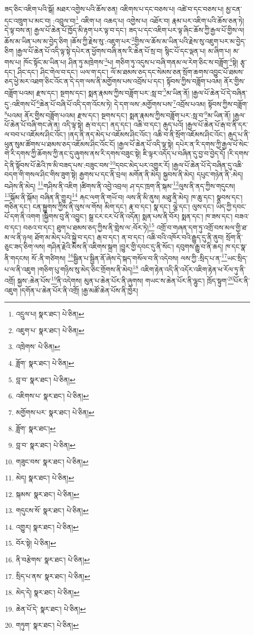 ཟད་ཅིང་འཇིག་པའི་སྒོ། མཐར་འགྱེས་པའི་ཆོས་ཅན། འཇིགས་པ་དང་བཅས་པ། འཚེ་བ་དང་བཅས་པ། མྱ་ངན་དང་འཁྲུག་པ་མང་བ། :འབྲུལ་བ།\footnote{འདྲུལ་པ།  སྣར་ཐང་།  པེ་ཅིན། } འཇིག་པ། འཆད་པ། འགྱེས་པ། འཐོར་བ། རྣམ་པར་འཇིག་པའི་ཆོས་ཅན་ཏེ། དེ་ལྟ་བས་ན། རྒྱལ་པོ་ཆེན་པོ་ཁྱོད་མི་རྟག་པར་ལྟ་བ་དང་། ཟད་པ་དང་འཇིག་པར་ལྟ་ཞིང་ཆོས་ཀྱི་རྒྱལ་པོ་གྱིས་ལ། ཆོས་མ་ཡིན་པས་མ་བྱེད་ཅིག །ཆོས་ཀྱི་རྗེས་སུ་:འཇུག་པར་\footnote{འཇུག་པ་  སྣར་ཐང་།  པེ་ཅིན། }གྱིས་ལ་ཆོས་མ་ཡིན་པའི་རྗེས་སུ་འཇུག་པར་མ་བྱེད་ཅིག །རྒྱལ་པོ་ཆེན་པོ་འདི་ལྟ་སྟེ་དཔེར་ན་ཕྱོགས་བཞི་ནས་རི་ཆེན་པོ་སྲ་བ། སྙིང་པོ་དང་ལྡན་པ། མ་ཞིག་པ། མ་གས་པ། ཁོང་སྟོང་མ་ཡིན་པ། ཤིན་ཏུ་མཁྲེགས་\footnote{འཁྲེགས་  པེ་ཅིན། }པ། གཅིག་ཏུ་འདུས་པ་བཞི་གནམ་ལ་རེག་ཅིང་ས་བཟློག་\footnote{ཟློག་  སྣར་ཐང་།  པེ་ཅིན། }སྟེ། རྩྭ་དང་། ཤིང་དང་། ཤིང་གེལ་བ་དང་། ཡལ་ག་དང་། ལོ་མ་ཐམས་ཅད་དང་སེམས་ཅན་སྲོག་ཆགས་འབྱུང་པོ་ཐམས་ཅད་ཕྱེ་མར་འཐག་ཅིང་འོང་ན་དེ་དག་ལས་ནི་མགྱོགས་པས་འབྲོས་པ་དང་། སྟོབས་ཀྱིས་བཟློག་པའམ། ནོར་གྱིས་བཟློག་པའམ། རྫས་དང་། སྔགས་དང་། སྨན་རྣམས་ཀྱིས་བཟློག་པར་:སླ་བ་\footnote{བླ་བ་  སྣར་ཐང་།  པེ་ཅིན། }མ་ཡིན་ནོ། །རྒྱལ་པོ་ཆེན་པོ་དེ་བཞིན་དུ་:འཇིགས་པོ་\footnote{འཇིགས་པ་  སྣར་ཐང་།  པེ་ཅིན། }ཆེན་པོ་བཞི་པོ་འདི་དག་འོངས་ཏེ། དེ་དག་ལས་:མགྱོགས་པས་\footnote{མགྱོགས་པར་  སྣར་ཐང་།  པེ་ཅིན། }འབྲོས་པའམ། སྟོབས་ཀྱིས་བཟློག་\footnote{ཟློག་  སྣར་ཐང་། }པའམ། ནོར་གྱིས་བཟློག་པའམ། རྫས་དང་། སྔགས་དང་། སྨན་རྣམས་ཀྱིས་བཟློག་པར་:སླ་བ་\footnote{བླ་བ་  སྣར་ཐང་།  པེ་ཅིན། }མ་ཡིན་ནོ། །རྒྱལ་པོ་ཆེན་པོ་བཞི་གང་ཞེ་ན། འདི་ལྟ་སྟེ། རྒ་བ་དང་། ནད་དང་། འཆི་བ་དང་། རྒུད་པའོ། །རྒྱལ་པོ་ཆེན་པོ་རྒ་བ་ནི་དར་ལ་བབ་པ་འཇོམས་ཤིང་འོང་། །ནད་ནི་ནད་མེད་པ་འཇོམས་ཤིང་འོང་། འཆི་བ་ནི་སྲོག་འཇོམས་ཤིང་འོང་། རྒུད་པ་ནི་ཕུན་སུམ་ཚོགས་པ་ཐམས་ཅད་འཇོམས་ཤིང་འོང་ངོ། །རྒྱལ་པོ་ཆེན་པོ་འདི་ལྟ་སྟེ། དཔེར་ན་རི་དགས་ཀྱི་རྒྱལ་པོ་སེང་གེ་རི་དགས་ཀྱི་ཆོགས་ཀྱི་ནང་དུ་ཞུགས་ནས་རི་དགས་བཟུང་སྟེ། ཇི་ལྟར་འདོད་པ་བཞིན་དུ་བྱ་བ་བྱེད་དོ། །རི་དགས་དེ་ནི་སྟོབས་པོ་ཆེའི་ཁ་མི་བཟད་པས་:བཟུང་བས་\footnote{གཟུང་བས་  སྣར་ཐང་།  པེ་ཅིན། }དབང་མེད་པར་འགྱུར་རོ། །རྒྱལ་པོ་ཆེན་པོ་དེ་བཞིན་དུ་འཆི་བདག་གི་གསལ་ཤིང་གིས་ཟུག་སྟེ། རྒྱགས་པ་དང་ནི་བྲལ། མགོན་ནི་མེད། སྐྱབས་ནི་མེད། དཔུང་གཉེན་ནི་:མེད། བཤེས་ནི་མེད། \footnote{མེད།    སྣར་ཐང་།  པེ་ཅིན། }གཤིས་ནི་འཇིག །ཚིགས་ནི་འབྱེ་འབྲལ། ཤ་དང་ཁྲག་ནི་སྐམ་\footnote{སྐམས་  སྣར་ཐང་།  པེ་ཅིན། }ལུས་ནི་ནད་ཀྱིས་གདུངས། \footnote{གདུངས་སོ་  སྣར་ཐང་།  པེ་ཅིན། }སྐོམ་ནི་སྐོམ། བཞིན་ནི་གྱུར།\footnote{འགྱུར།  སྣར་ཐང་།  པེ་ཅིན། } རྐང་ལག་ནི་གཡོ་བ། ལས་ནི་མི་ནུས། མཐུ་ནི་མེད། ཁ་ཆུ་དང་། སྣབས་དང་། གཅིན་དང་། ངན་སྐྱུགས་ཀྱིས་ནི་ལུས་ལ་གོས། མིག་དང་། རྣ་བ་དང་། སྣ་དང་། ལྕེ་དང་། ལུས་དང་། ཡིད་ཀྱི་དབང་པོ་དག་ནི་འགག །སྐྱིགས་བུ་ནི་འབྱུང་། སྒྲ་ངར་ངར་པོ་ནི་འདོན། སྨན་པས་ནི་བོར། སྨན་དང་། ཁ་ཟས་དང་། བཟའ་བ་དང་། བཅའ་བ་དང་། ཐུག་པ་ཐམས་ཅད་ཀྱིས་ནི་གླེས་ལ་:བོར་ཏེ།\footnote{བོར་སྟེ།  པེ་ཅིན། } འགྲོ་བ་གཞན་དག་ཏུ་འགྲོ་བས་མལ་གྱི་ཐ་མ་ལ་ནི་ཉལ། ཐོག་མ་མེད་པའི་སྐྱེ་བ་དང་། རྒ་བ་དང་། ན་བ་དང་། འཆི་བའི་འཁོར་བའི་རྒྱུད་དུ་ནི་ནུབ། སྲོག་ནི་ཅུང་ཟད་ཅིག་ལས། གཤིན་རྗེའི་མིས་ནི་འཇིགས་སྐྲག །བྱུར་གྱི་དབང་དུ་ནི་སོང་། དབུགས་རྒྱུ་བ་ནི་ཆད། ཁ་དང་སྣ་ནི་གདངས། སོ་:ནི་གཙིགས། \footnote{ནི་བརྩེགས་  སྣར་ཐང་།  པེ་ཅིན། }སྦྱིན་པ་སྦྱིན་ནོ་ཞེས་དེ་སྐད་གསོལ་བ་ནི་འདེབས། ལས་ཀྱི་:སྲིད་པ་ན་\footnote{སྲིད་པ་ནས་  སྣར་ཐང་།  པེ་ཅིན། }ཡང་སྲིད་པ་ལ་ནི་འཇུག །གཅིག་པུ་གཉིས་སུ་མེད་ཅིང་གྲོགས་ནི་མེད།\footnote{མེད་དེ།  སྣར་ཐང་།  པེ་ཅིན། } འཇིག་རྟེན་འདི་ནི་འདོར་འཇིག་རྟེན་ཕ་རོལ་ཏུ་ནི་འགྲོ། སྐྱས་:ཆེན་པོས་\footnote{ཆེན་པོ་དེ་  སྣར་ཐང་།  པེ་ཅིན། }ནི་འདེགས། མུན་པ་ཆེན་པོར་ནི་ཞུགས། གཡང་ས་ཆེན་པོར་ནི་ལྷུང་། ཁྲོད་སྟུག་\footnote{གཏུག་  སྣར་ཐང་།  པེ་ཅིན། }པོར་ནི་འཇུག །དགོན་པ་ཆེན་པོར་ནི་འགྲོ། །རྒྱ་མཚོ་ཆེན་པོས་ནི་ཁྱེར། 